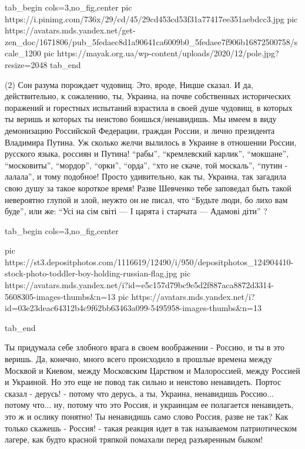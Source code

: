 \ifcmt
  tab_begin cols=3,no_fig,center
     pic https://i.pinimg.com/736x/29/cd/45/29cd453cd53f31a77417ee351aebdcc3.jpg
     pic https://avatars.mds.yandex.net/get-zen_doc/1671806/pub_5fedaec8d1a90641ca6009b0_5fedaee7f906b16872500758/scale_1200
     pic https://mayak.org.ua/wp-content/uploads/2020/12/pole.jpg?resize=2048%
  tab_end
\fi

(2) Сон разума порождает чудовищ. Это, вроде, Ницше сказал. И да,
действительно, к сожалению, ты, Украина, на почве собственных исторических
поражений и горестных испытаний взрастила в своей душе чудовищ, в которых ты
веришь и которых ты неистово боишься/ненавидишь. Мы имеем в виду демонизацию
Российской Федерации, граждан России, и лично президента Владимира Путина. Уж
сколько желчи вылилось в Украине в отношении России, русского языка, россиян и
Путина! \enquote{рабы}, \enquote{кремлевский карлик}, \enquote{мокшане},
\enquote{московиты}, \enquote{мордор}, \enquote{орки}, \enquote{орда},
\enquote{хто не скаче, той москаль}, \enquote{путин - лалала}, и тому подобное!
Просто удивительно, как ты, Украина, так загадила свою душу за такое короткое
время! Разве Шевченко тебе заповедал быть такой невероятно глупой и злой,
неужто он не писал, что \enquote{Будьте люди, бо лихо вам буде}, или же:
\enquote{Усі на сім світі — І царята і старчата — Адамові діти} ? 

\ifcmt
  tab_begin cols=3,no_fig,center

     pic https://st3.depositphotos.com/1116619/12490/i/950/depositphotos_124904410-stock-photo-toddler-boy-holding-russian-flag.jpg
     pic https://avatars.mds.yandex.net/i?id=e5c157d79bc9e5d2f887aca8872d3314-5608305-images-thumbs&n=13
     pic https://avatars.mds.yandex.net/i?id=03e23deac64312b4c9f62bb63463a099-5495958-images-thumbs&n=13

  tab_end
\fi

Ты придумала себе злобного врага в своем
воображении - Россию, и ты в это веришь. Да, конечно, много всего происходило в
прошлые времена между Москвой и Киевом, между Московским Царством и
Малороссией, между Россией и Украиной.  Но это еще не повод так сильно и
неистово ненавидеть. Портос сказал - дерусь! - потому что дерусь, а ты,
Украина, ненавидишь Россию... потому что... ну, потому что это Россия, и
украинцам ее полагается ненавидеть, это ж и ослику понятно! Ты ненавидишь само
слово Россия, разве не так? Как только скажешь - Россия! - такая реакция идет в
так называемом патриотическом лагере, как будто красной тряпкой помахали перед
разъяренным быком! 

